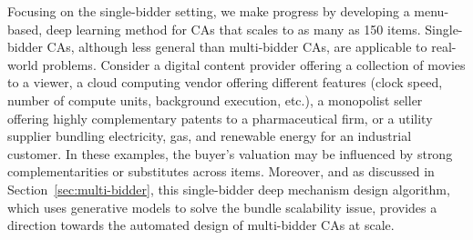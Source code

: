 Focusing on the single-bidder setting, we make progress by developing a menu-based, deep learning method for  CAs that scales to as many as 
150 items.   Single-bidder CAs, although less general than multi-bidder CAs, are applicable to  real-world problems. Consider  a digital content provider offering a collection of movies to a viewer, a cloud computing vendor offering different features (clock speed, number of compute units,  background execution, etc.), a monopolist seller offering  highly complementary patents to a  pharmaceutical firm, or a utility  supplier bundling electricity, gas, and renewable energy for an industrial customer. In these examples, the buyer's valuation may be influenced by strong complementarities or substitutes across items.
Moreover, and as discussed in Section~\ref{sec:multi-bidder}, 
this single-bidder deep mechanism design algorithm, which uses generative models to solve
the bundle scalability issue, provides a 
direction towards the automated design of multi-bidder CAs at scale.
%

